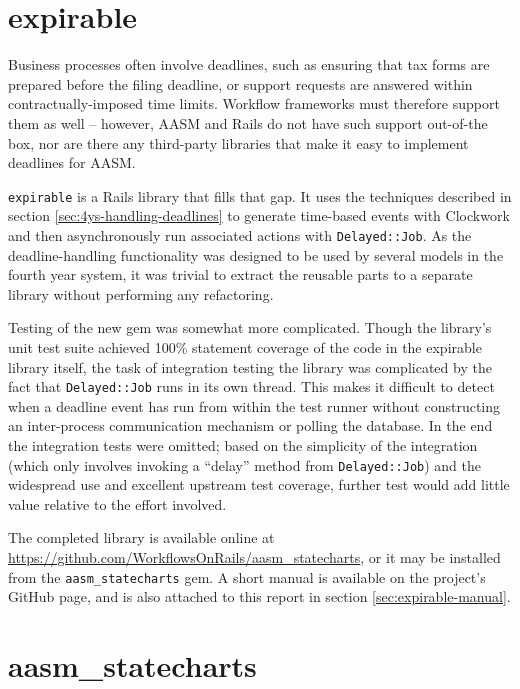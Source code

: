 \documentclass[document.tex]{subfiles}
\begin{document}
\FloatBarrier


\section {expirable}

Business processes often involve deadlines, such as ensuring that tax forms are prepared before the filing deadline, or support requests are answered within contractually-imposed time limits. Workflow frameworks must therefore support them as well -- however, AASM and Rails do not have such support out-of-the box, nor are there any third-party libraries that make it easy to implement deadlines for AASM.

\verb!expirable! \cite{expirable} is a Rails library that fills that gap. It uses the techniques described in section \ref{sec:4ys-handling-deadlines} to generate time-based events with Clockwork and then asynchronously run associated actions with \verb!Delayed::Job!. As the deadline-handling functionality was designed to be used by several models in the fourth year system, it was trivial to extract the reusable parts to a separate library without performing any refactoring.

Testing of the new gem was somewhat more complicated. Though the library's unit test suite achieved 100\% statement coverage of the code in the expirable library itself, the task of integration testing the library was complicated by the fact that \verb!Delayed::Job! runs in its own thread. This makes it difficult to detect when a deadline event has run from within the test runner without constructing an inter-process communication mechanism or polling the database. In the end the integration tests were omitted; based on the simplicity of the integration (which only involves invoking a ``delay'' method from \verb!Delayed::Job!) and the widespread use and excellent upstream test coverage, further test would add little value relative to the effort involved.

The completed library is available online at \url{https://github.com/WorkflowsOnRails/aasm_statecharts}, or it may be installed from the \verb!aasm_statecharts! gem.
A short manual is available on the project's GitHub page, and is also attached to this report in section \ref{sec:expirable-manual}.


\section {aasm\_statecharts}
\end{document}
